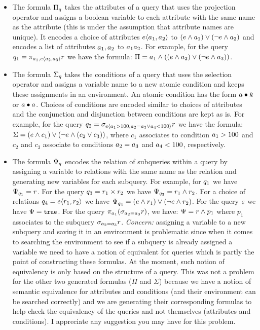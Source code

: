 \documentclass[12pt]{article}
\begin{document}
\begin{itemize}
\item 
 The formula $\Pi_\vQ$ takes the attributes of a query that uses the  projection operator and
 assigns a boolean variable to each attribute with the same name as the attribute (this is
 under the assumption that attribute names are unique). It encodes a choice of attributes $\chc {\att_1, \att_2}$
to $(\dimMeta \wedge \att_1) \vee (\neg \dimMeta \wedge \att_2)$ and encodes a list of attributes $\att_1, \att_2$ to $\att_1 \att_2$.
For example, for the query $\vQ_1 = \pi_{\att_1, \chc {\att_2, \att_3}} \vRel$ we have the formula:
$\Pi = \att_1 \wedge ((\dimMeta \wedge \att_2) \vee (\neg \dimMeta \wedge \att_3))$.
\item
The formula $\Sigma_\vQ$ takes the conditions of a query that uses the selection operator
and assigns a variable name to a new atomic condition and keeps these assignments in an environment.
An atomic condition has the form $\att\bullet\cte$ or  $\att\bullet\att $. Choices of conditions are encoded 
similar to choices of attributes and the conjunction and disjunction between conditions are kept as is.
For example, for the query
$\vQ_2 = \sigma_{\chc {\att_1 > 100, \att_2 = \att_3 \vee \att_4 < 100}} \vRel$
we have the formula:
$\Sigma = (\dimMeta \wedge c_1) \vee (\neg \dimMeta \wedge (c_2 \vee c_3))$,
where $c_1$ associates to condition $\att_1 >100$
and $c_2$ and $c_3$ associate to conditions $\att_2 = \att_3$ and $\att_4 <100$,
respectively.
\item 
The formula $\Psi _\vQ$ encodes the relation of subqueries within a query by assigning 
a variable to relations with the same name as the relation and generating new variables 
for each subquery. For example, for $\vQ_1$ we have $\Psi_{\vQ_1 } = \vRel$.
For the query $\vQ_3 = \vRel_1 \times \vRel_2$ we have
$\Psi_{\vQ_3} = \vRel_1 \wedge \vRel_2$. For a choice of relations 
$\vQ_4 = \chc {\vRel_1, \vRel_2}$ we have $\Psi_{\vQ_4}= (\dimMeta \wedge \vRel_1) \vee (\neg \dimMeta \wedge \vRel_2)$. For the query $\empRel$ we have $\Psi = \t$. 
For the query $\pi_{\att_1} (\sigma_{\att_2=\att_3} \vRel)$, we have:
$\Psi = \vRel \wedge p_1 $ where $p_1$ associates to the subquery $\sigma_{\att_2=\att_3} \vRel$.
\emph{Concern:} assigning a variable to a new subquery and saving it in an environment is problematic since
when it comes to searching the environment to see if a subquery is already assigned a variable 
we need to have a notion of equivalent for queries which is partly the point of constructing these formulas.
At the moment, such notion of equivalency is only based on the structure of a query. This was not a problem
for the other two generated formulas ($\Pi$ and $\Sigma$) because we have a notion of semantic equivalence for attributes and conditions (and their environment can be searched correctly) and we are generating their corresponding formulas to help check the equivalency of the queries and not themselves (attributes and conditions). I appreciate any suggestion you may have for this problem.
\end{itemize}
\end{document}
